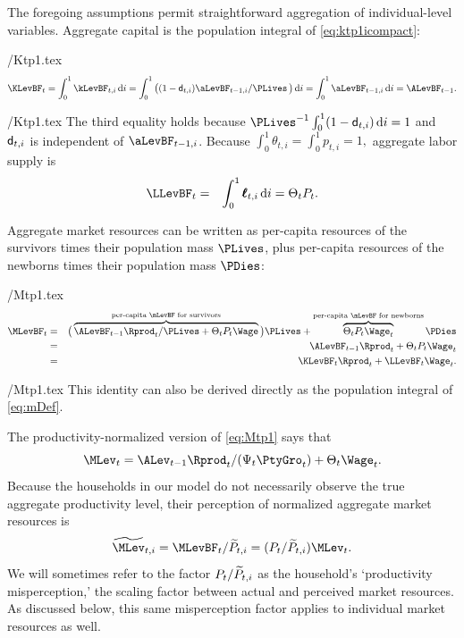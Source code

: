 \documentclass[titlepage]{\econtex}\newcommand{\texname}{cAndCwithStickyE}
\begin{document}
The foregoing assumptions permit straightforward aggregation of individual-level variables.  Aggregate capital is the population integral of \eqref{eq:ktp1icompact}:
\begin{verbatimwrite}{\eq/Ktp1.tex}
\begin{equation}
\KLevBF_{t} = \int_{0}^{1} \kLevBF_{t,i}\,\text{d}i = \int_{0}^{1} \big((1 - \pDies_{t,i})\aLevBF_{t-1,i} /\PLives\, \big)\,\text{d}i = \int_{0}^{1} \aLevBF_{t-1,i}\,\text{d}i = \ALevBF_{t-1}.   \label{eq:Ktp1}
\end{equation}
\end{verbatimwrite}
 \eq/Ktp1.tex
The third equality holds because $\PLives^{-1}\int_{0}^{1}(1-\pDies_{t,i})\,\text{d}i = 1$
and $\mathsf{d}_{t,i}$ is independent of $\aLevBF_{t-1,i}$.
Because $\int_{0}^{1} \theta_{t,i} = \int_{0}^{1} {p}_{t,i} = 1,$ aggregate labor supply
is
\begin{eqnarray}
  \label{eq:Lt}
  \LLevBF_{t} & = & \int_{0}^{1} \pmb{\ell}_{t,i}\,\text{d}i = \Theta_{t} {P}_{t}.
\end{eqnarray}

Aggregate market resources can be written as per-capita resources of the survivors
times their population mass $\PLives$, plus per-capita resources of the newborns
times their population mass $\PDies$:
\begin{verbatimwrite}{\eq/Mtp1.tex}
\begin{eqnarray}
  \MLevBF_{t} & = & \big(\overbrace{\ALevBF_{t-1} {\Rprod}_t/\PLives  + \Theta_{t} {P}_{t}\Wage}^{\text{per-capita $\mLevBF$ for survivors}}\big)\PLives+\overbrace{\Theta_{t} {P}_{t}\Wage_t}^{\text{per-capita $\mLevBF$ for newborns}} \PDies \nonumber \\
                       & = & \ALevBF_{t-1} {\Rprod}_t + \Theta_{t} P_t \Wage_t  \label{eq:Mtp1} \\
                       & = & \KLevBF_t \Rprod_t + \LLevBF_t \Wage_t. \nonumber
\end{eqnarray}
\end{verbatimwrite}
 \eq/Mtp1.tex
This identity can also be derived directly as the population integral of \eqref{eq:mDef}.

The productivity-normalized version of \eqref{eq:Mtp1} says that
\begin{equation}\label{eq:Mtp1norm}
\MLev_t = \ALev_{t-1} \Rprod_t/(\Psi_t \PtyGro_t) + \Theta_t \Wage_t.
\end{equation}
Because the households in our model do not necessarily observe the true aggregate productivity level, their perception of normalized aggregate market resources is
\begin{equation}
\perc{\MLev}_{t,i} = \MLevBF_t/\perc{P}_{t,i} = (P_t/\perc{P}_{t,i}) \MLev_t .
\end{equation}
We will sometimes refer to the factor $P_t/\widetilde{P}_{t,i}$ as the household's `productivity misperception,' the scaling factor between actual and perceived market resources.  As discussed below, this same misperception factor applies to individual market resources as well.
\end{document}
